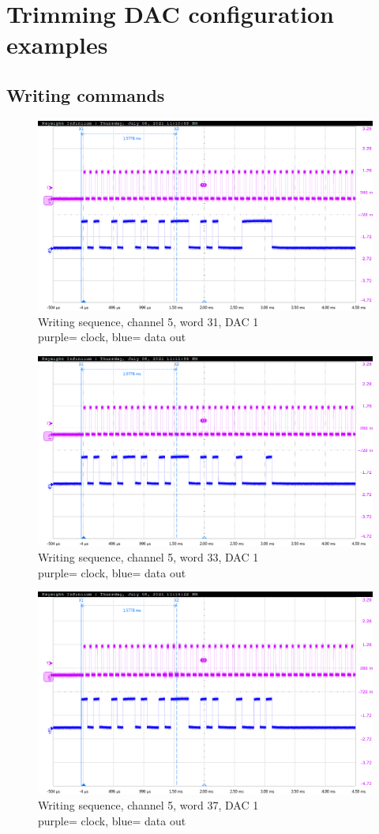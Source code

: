 \pagestyle{plain}
\appendix
\chapter{Trimming DAC configuration examples}\label{DacAppendix}
\section{Writing commands}
\begin{figure}[H]
	\centering
	\includegraphics[width=0.6\linewidth]{IMG/ch5/probe/09-08-2021_ch05-write31-baselinedac1}
	\caption{Writing sequence, channel 5, word 31, DAC 1\\{\color{magenta}purple}= clock, {\color{blue}blue}= data out}
	\label{fig:ch05write31}
\end{figure}

\begin{figure}[H]
	\centering
	\includegraphics[width=0.6\linewidth]{IMG/ch5/probe/09-08-2021_ch05-write33-baselinedac1}
	\caption{Writing sequence, channel 5, word 33, DAC 1\\{\color{magenta}purple}= clock, {\color{blue}blue}= data out}
	\label{fig:ch05write33}
\end{figure}
\begin{figure}[H]
	\centering
	\includegraphics[width=0.6\linewidth]{IMG/ch5/probe/09-08-2021_ch05-write37-baselinedac1}
	\caption{Writing sequence, channel 5, word 37, DAC 1\\{\color{magenta}purple}= clock, {\color{blue}blue}= data out}
	\label{fig:ch05write37}
\end{figure}

